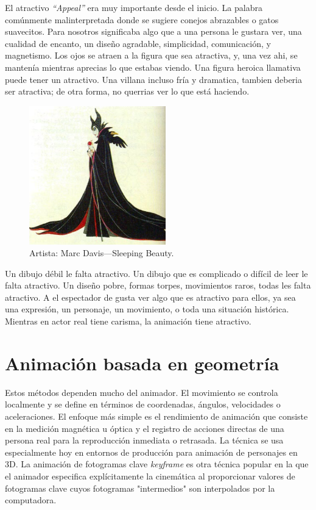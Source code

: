 \documentclass[a4paper,12pt]{report}
\begin{document}
 
El atractivo \textit{``Appeal''} era muy importante desde el inicio. La palabra comúnmente malinterpretada donde se sugiere conejos abrazables o gatos suavecitos.
Para nosotros significaba algo que a una persona le gustara ver, una cualidad de encanto, un diseño agradable, simplicidad,
comunicación, y magnetismo. Los ojos se atraen a la figura que sea atractiva, y, una vez ahi, se mantenía mientras aprecias lo que estabas viendo.
Una figura heroica llamativa puede tener un atractivo. Una villana incluso fría y dramatica, tambien deberia ser atractiva; de otra forma,
no querrias ver lo que está haciendo.\cite{principles_animation}
 
 
\begin{figure}[ht]
    \centering
    \includegraphics[height=6cm]{Imagenes/sleeping_beauty}
    \caption{Artista: Marc Davis---Sleeping Beauty.}
    \label{fig:sleeping_beauty}
\end{figure}
 
 
 
Un dibujo débil le falta atractivo. Un dibujo que es complicado o difícil de leer le falta atractivo. Un diseño pobre, formas torpes, movimientos raros, 
todas les falta atractivo. A el espectador de gusta ver algo que es atractivo para ellos, ya sea una expresión, un personaje, un movimiento,
o toda una situación histórica. Mientras en actor real tiene carisma, la animación tiene atractivo.\cite{principles_animation}
 
 
\chapter{Animación basada en geometría}
 
 
Estos métodos dependen mucho del animador. 
El movimiento se controla localmente y se define en términos de coordenadas, 
ángulos, velocidades o aceleraciones. El enfoque más simple es el rendimiento de
animación que consiste en la medición magnética u óptica y el registro de acciones 
directas de una persona real para la reproducción inmediata o retrasada. 
La técnica se usa especialmente hoy en entornos de producción para animación de personajes en 3D.
La animación de fotogramas clave \textit{keyframe} es otra técnica popular en la que el animador especifica explícitamente
la cinemática al proporcionar valores de fotogramas clave cuyos fotogramas "intermedios" 
son interpolados por la computadora.\cite{animation_types}
 
\end{document}
